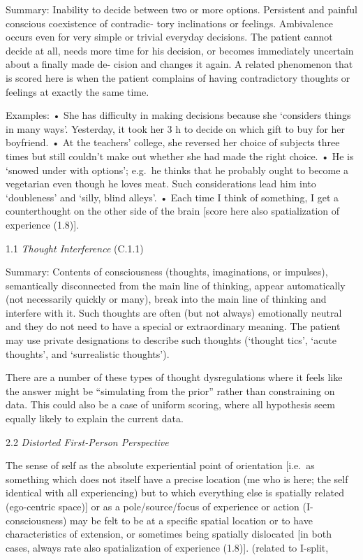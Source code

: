 \documentclass[
  letterpaper,
  DIV=11,
  numbers=noendperiod]{scrartcl}
\begin{document}
Summary: Inability to decide between two or more options. Persistent and
painful conscious coexistence of contradic- tory inclinations or
feelings. Ambivalence occurs even for very simple or trivial everyday
decisions. The patient cannot decide at all, needs more time for his
decision, or becomes immediately uncertain about a finally made de-
cision and changes it again. A related phenomenon that is scored here is
when the patient complains of having contradictory thoughts or feelings
at exactly the same time.

Examples: • She has difficulty in making decisions because she
`considers things in many ways'. Yesterday, it took her 3 h to decide on
which gift to buy for her boyfriend. • At the teachers' college, she
reversed her choice of subjects three times but still couldn't make out
whether she had made the right choice. • He is `snowed under with
options'; e.g.~he thinks that he probably ought to become a vegetarian
even though he loves meat. Such considerations lead him into
`doubleness' and `silly, blind alleys'. • Each time I think of
something, I get a counterthought on the other side of the brain
{[}score here also spatialization of experience (1.8){]}.

1.1 \emph{Thought Interference} (C.1.1)

Summary: Contents of consciousness (thoughts, imaginations, or
impulses), semantically disconnected from the main line of thinking,
appear automatically (not necessarily quickly or many), break into the
main line of thinking and interfere with it. Such thoughts are often
(but not always) emotionally neutral and they do not need to have a
special or extraordinary meaning. The patient may use private
designations to describe such thoughts (`thought tics', `acute
thoughts', and `surrealistic thoughts').

There are a number of these types of thought dysregulations where it
feels like the answer might be ``simulating from the prior'' rather than
constraining on data. This could also be a case of uniform scoring,
where all hypothesis seem equally likely to explain the current data.

2.2 \emph{Distorted First-Person Perspective}

The sense of self as the absolute experiential point of orientation
{[}i.e.~as something which does not itself have a precise location (me
who is here; the self identical with all experiencing) but to which
everything else is spatially related (ego-centric space){]} or as a
pole/source/focus of experience or action (I-consciousness) may be felt
to be at a specific spatial location or to have characteristics of
extension, or sometimes being spatially dislocated {[}in both cases,
always rate also spatialization of experience (1.8){]}. (related to
I-split,
\end{document}
